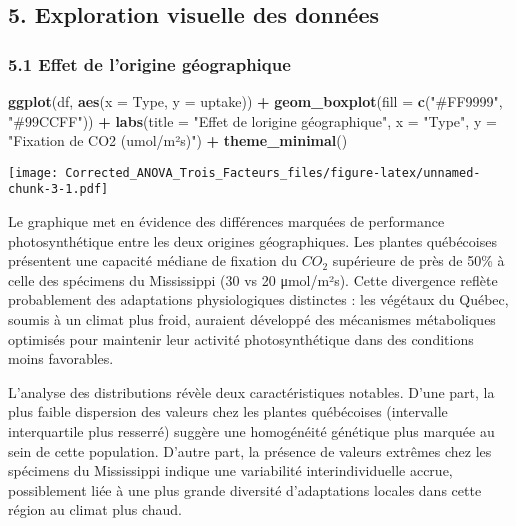 \documentclass[
]{article}
\newenvironment{Shaded}{\begin{snugshade}}{\end{snugshade}}
\newcommand{\AttributeTok}[1]{\textcolor[rgb]{0.13,0.29,0.53}{#1}}
\newcommand{\FunctionTok}[1]{\textcolor[rgb]{0.13,0.29,0.53}{\textbf{#1}}}
\newcommand{\NormalTok}[1]{#1}
\newcommand{\SpecialCharTok}[1]{\textcolor[rgb]{0.81,0.36,0.00}{\textbf{#1}}}
\newcommand{\StringTok}[1]{\textcolor[rgb]{0.31,0.60,0.02}{#1}}
\begin{document}
\subsection{5. Exploration visuelle des
données}\label{exploration-visuelle-des-donnuxe9es}

\subsubsection{5.1 Effet de l'origine
géographique}\label{effet-de-lorigine-guxe9ographique}

\begin{Shaded}
\begin{Highlighting}[]
\FunctionTok{ggplot}\NormalTok{(df, }\FunctionTok{aes}\NormalTok{(}\AttributeTok{x =}\NormalTok{ Type, }\AttributeTok{y =}\NormalTok{ uptake)) }\SpecialCharTok{+} 
  \FunctionTok{geom\_boxplot}\NormalTok{(}\AttributeTok{fill =} \FunctionTok{c}\NormalTok{(}\StringTok{"\#FF9999"}\NormalTok{, }\StringTok{"\#99CCFF"}\NormalTok{)) }\SpecialCharTok{+}
  \FunctionTok{labs}\NormalTok{(}\AttributeTok{title =} \StringTok{"Effet de l\textquotesingle{}origine géographique"}\NormalTok{,}
       \AttributeTok{x =} \StringTok{"Type"}\NormalTok{, }\AttributeTok{y =} \StringTok{"Fixation de CO2 (umol/m²s)"}\NormalTok{) }\SpecialCharTok{+}
  \FunctionTok{theme\_minimal}\NormalTok{()}
\end{Highlighting}
\end{Shaded}

\texttt{[image: Corrected\_ANOVA\_Trois\_Facteurs\_files/figure-latex/unnamed-chunk-3-1.pdf]}

Le graphique met en évidence des différences marquées de performance
photosynthétique entre les deux origines géographiques. Les plantes
québécoises présentent une capacité médiane de fixation du \(CO_2\)
supérieure de près de 50\% à celle des spécimens du Mississippi (30 vs
20 μmol/m²s). Cette divergence reflète probablement des adaptations
physiologiques distinctes : les végétaux du Québec, soumis à un climat
plus froid, auraient développé des mécanismes métaboliques optimisés
pour maintenir leur activité photosynthétique dans des conditions moins
favorables.

L'analyse des distributions révèle deux caractéristiques notables. D'une
part, la plus faible dispersion des valeurs chez les plantes québécoises
(intervalle interquartile plus resserré) suggère une homogénéité
génétique plus marquée au sein de cette population. D'autre part, la
présence de valeurs extrêmes chez les spécimens du Mississippi indique
une variabilité interindividuelle accrue, possiblement liée à une plus
grande diversité d'adaptations locales dans cette région au climat plus
chaud.
\end{document}

